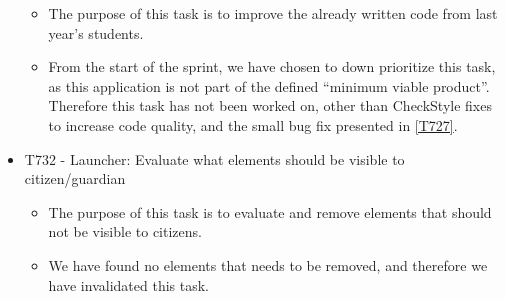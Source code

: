 \begin{itemize}
    \begin{itemize}
  	\item The purpose of this task is to improve the already written code from
  	last year's students. 
  	\item From the start of the sprint, we have chosen to down prioritize this
  	task, as this application is not part of the defined ``minimum viable
  	product''. Therefore this task has not been worked on, other than CheckStyle
  	fixes to increase code quality, and the small bug fix presented in
  	\autoref{T727}.
  \end{itemize}
  \item T732 - Launcher: Evaluate what elements should be visible to
citizen/guardian
  \begin{itemize}
  	\item The purpose of this task is to evaluate and remove elements that should
  	not be visible to citizens.
  	\item We have found no elements that needs to be removed, and therefore we
  	have invalidated this task.
  \end{itemize}
\end{itemize}





















